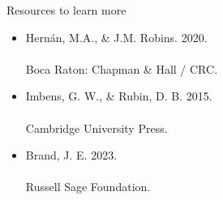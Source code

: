 \documentclass{beamer}
\newcommand\bref[2]{\href{#1}{\color{blue}{#2}}}
\begin{document}
\begin{frame}{Resources to learn more}
\begin{itemize}
\item Hernán, M.A., \& J.M. Robins. 2020.\\\bref{https://www.hsph.harvard.edu/miguel-hernan/causal-inference-book/}{Causal Inference: What If?}\\Boca Raton: Chapman \& Hall / CRC.
\item Imbens, G. W., \& Rubin, D. B. 2015.\\\bref{https://www.cambridge.org/core/books/causal-inference-for-statistics-social-and-biomedical-sciences/71126BE90C58F1A431FE9B2DD07938AB}{Causal Inference in Statistics, Social, and Biomedical Sciences.}\\Cambridge University Press.
\item Brand, J. E. 2023.\\\bref{https://www.russellsage.org/publications/overcoming-odds}{Overcoming the Odds: The Benefits of Completing College for Unlikely Graduates.}\\Russell Sage Foundation.
\end{itemize}
\end{frame}
\end{document}
